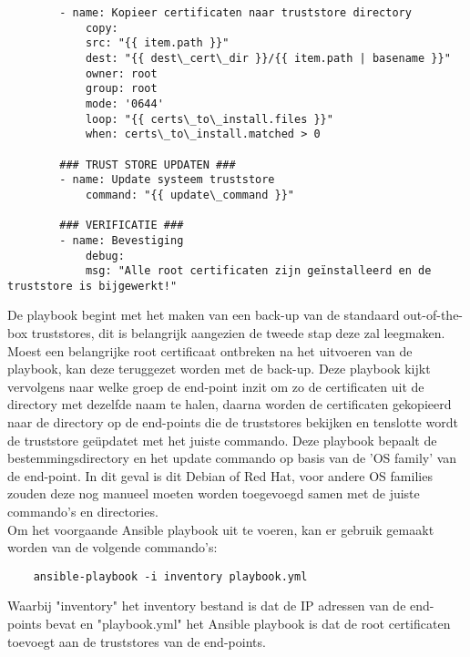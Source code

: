 \begin{verbatim}
        - name: Kopieer certificaten naar truststore directory
            copy:
            src: "{{ item.path }}"
            dest: "{{ dest\_cert\_dir }}/{{ item.path | basename }}"
            owner: root
            group: root
            mode: '0644'
            loop: "{{ certs\_to\_install.files }}"
            when: certs\_to\_install.matched > 0
    
        ### TRUST STORE UPDATEN ###
        - name: Update systeem truststore
            command: "{{ update\_command }}"
    
        ### VERIFICATIE ###
        - name: Bevestiging
            debug:
            msg: "Alle root certificaten zijn geïnstalleerd en de truststore is bijgewerkt!" 
\end{verbatim}

De playbook begint met het maken van een back-up van de standaard out-of-the-box truststores, dit is belangrijk aangezien de tweede stap deze zal leegmaken. Moest een belangrijke root certificaat ontbreken na het uitvoeren van de playbook, kan deze teruggezet worden met de back-up.
Deze playbook kijkt vervolgens naar welke groep de end-point inzit om zo de certificaten uit de directory met dezelfde naam te halen, daarna worden de certificaten gekopieerd naar de directory op de end-points die de truststores bekijken en tenslotte wordt de truststore geüpdatet met het juiste commando. 
Deze playbook bepaalt de bestemmingsdirectory en het update commando op basis van de 'OS family' van de end-point.
In dit geval is dit Debian of Red Hat, voor andere OS families zouden deze nog manueel moeten worden toegevoegd samen met de juiste commando's en directories. \\

Om het voorgaande Ansible playbook uit te voeren, kan er gebruik gemaakt worden van de volgende commando's:
\begin{verbatim}
    ansible-playbook -i inventory playbook.yml
\end{verbatim}

Waarbij "inventory" het inventory bestand is dat de IP adressen van de end-points bevat en "playbook.yml" het Ansible playbook is dat de root certificaten toevoegt aan de truststores van de end-points. \\

